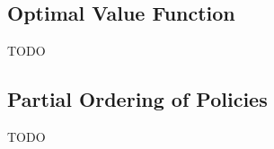 %
%
%

\subsection{Optimal Value Function}\label{subsec:optimal-value-function}
TODO
%

\subsection{Partial Ordering of Policies}\label{subsec:partial-ordering-of-policies}
TODO
%
%
%


